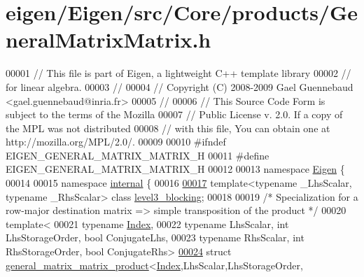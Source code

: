 \hypertarget{eigen_2_eigen_2src_2_core_2products_2_general_matrix_matrix_8h_source}{}\section{eigen/\+Eigen/src/\+Core/products/\+General\+Matrix\+Matrix.h}
\label{eigen_2_eigen_2src_2_core_2products_2_general_matrix_matrix_8h_source}

\begin{DoxyCode}
00001 \textcolor{comment}{// This file is part of Eigen, a lightweight C++ template library}
00002 \textcolor{comment}{// for linear algebra.}
00003 \textcolor{comment}{//}
00004 \textcolor{comment}{// Copyright (C) 2008-2009 Gael Guennebaud <gael.guennebaud@inria.fr>}
00005 \textcolor{comment}{//}
00006 \textcolor{comment}{// This Source Code Form is subject to the terms of the Mozilla}
00007 \textcolor{comment}{// Public License v. 2.0. If a copy of the MPL was not distributed}
00008 \textcolor{comment}{// with this file, You can obtain one at http://mozilla.org/MPL/2.0/.}
00009 
00010 \textcolor{preprocessor}{#ifndef EIGEN\_GENERAL\_MATRIX\_MATRIX\_H}
00011 \textcolor{preprocessor}{#define EIGEN\_GENERAL\_MATRIX\_MATRIX\_H}
00012 
00013 \textcolor{keyword}{namespace }\hyperlink{namespace_eigen}{Eigen} \{
00014 
00015 \textcolor{keyword}{namespace }\hyperlink{namespaceinternal}{internal} \{
00016 
\hyperlink{class_eigen_1_1internal_1_1level3__blocking}{00017} \textcolor{keyword}{template}<\textcolor{keyword}{typename} \_LhsScalar, \textcolor{keyword}{typename} \_RhsScalar> \textcolor{keyword}{class }\hyperlink{class_eigen_1_1internal_1_1level3__blocking}{level3\_blocking};
00018 
00019 \textcolor{comment}{/* Specialization for a row-major destination matrix => simple transposition of the product */}
00020 \textcolor{keyword}{template}<
00021   \textcolor{keyword}{typename} \hyperlink{namespace_eigen_a62e77e0933482dafde8fe197d9a2cfde}{Index},
00022   \textcolor{keyword}{typename} LhsScalar, \textcolor{keywordtype}{int} LhsStorageOrder, \textcolor{keywordtype}{bool} ConjugateLhs,
00023   \textcolor{keyword}{typename} RhsScalar, \textcolor{keywordtype}{int} RhsStorageOrder, \textcolor{keywordtype}{bool} ConjugateRhs>
\hyperlink{struct_eigen_1_1internal_1_1general__matrix__matrix__product_3_01_index_00_01_lhs_scalar_00_01_l7e45e4188e95a69de1c658ab4a83c882}{00024} \textcolor{keyword}{struct }\hyperlink{struct_eigen_1_1internal_1_1general__matrix__matrix__product}{general\_matrix\_matrix\_product}<\hyperlink{namespace_eigen_a62e77e0933482dafde8fe197d9a2cfde}{Index},LhsScalar,LhsStorageOrder,

\end{DoxyCode}
